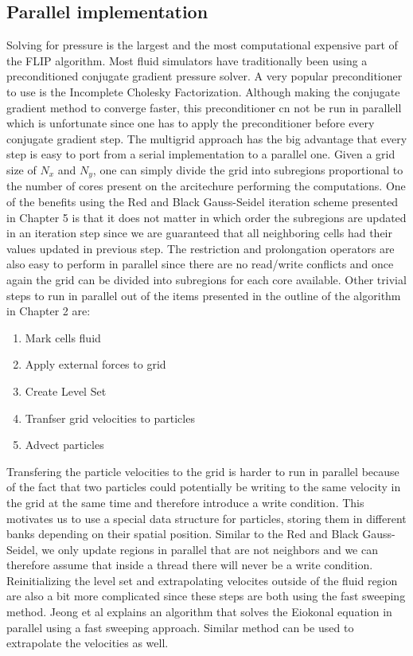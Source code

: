 \subsection{Parallel implementation}

Solving for pressure is the largest and the most computational expensive part of the FLIP algorithm. Most fluid simulators have traditionally been using a preconditioned conjugate gradient pressure solver. A very popular preconditioner to use is the Incomplete Cholesky Factorization. Although making the conjugate gradient method to converge faster, this preconditioner cn not be run in parallell which is unfortunate since one has to apply the preconditioner before every conjugate gradient step. The multigrid approach has the big advantage that every step is easy to port from a serial implementation to a parallel one. Given a grid size of $N_x$ and $N_y$, one can simply divide the grid into subregions proportional to the number of cores present on the arcitechure performing the computations. One of the benefits using the Red and Black Gauss-Seidel iteration scheme presented in Chapter 5 is that it does not matter in which order the subregions are updated in an iteration step since we are guaranteed that all neighboring cells had their values updated in previous step. The restriction and prolongation operators are also easy to perform in parallel since there are no read/write conflicts and once again the grid can be divided into subregions for each core available. Other trivial steps to run in parallel out of the items presented in the outline of the algorithm in Chapter 2 are:

\begin{enumerate}
\item Mark cells fluid
\item Apply external forces to grid
\item Create Level Set
\item Tranfser grid velocities to particles
\item Advect particles
\end{enumerate}

Transfering the particle velocities to the grid is harder to run in parallel because of the fact that two particles could potentially be writing to the same velocity in the grid at the same time and therefore introduce a write condition. This motivates us to use a special data structure for particles, storing them in different banks depending on their spatial position. Similar to the Red and Black Gauss-Seidel, we only update regions in parallel that are not neighbors and we can therefore assume that inside a thread there will never be a write condition.
\newline
\newline
Reinitializing the level set and extrapolating velocites outside of the fluid region are also a bit more complicated since these steps are both using the fast sweeping method. Jeong et al\cite{jeong}  explains an algorithm that solves the Eiokonal equation in parallel using a fast sweeping approach. Similar method can be used to extrapolate the velocities as well.
